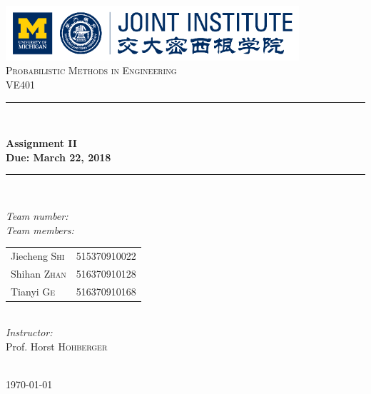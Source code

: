 \begin{titlepage}

\newcommand{\HRule}{\rule{\linewidth}{0.5mm}}

\center

\includegraphics[height=0.8in]{images/logo.png}\\[1cm]

\textsc{\Large Probabilistic Methods in Engineering}\\[0.4cm]
\textsc{\large VE401}\\[0.4cm]

\HRule \\[0.4cm]
{
    \bfseries
    {\huge Assignment II}\\[0.3cm]
    {\large Due: March 22, 2018}\\[0.2cm]
    \HRule \\[1.5cm]
}

\begin{minipage}{0.4\textwidth}

\large
\emph{Team number:} \quad{}\\

\emph{Team members:}\\

\begin{tabular}{ll}
    Jiecheng  \textsc{Shi} & 515370910022\\
    Shihan  \textsc{Zhan} & 516370910128\\
    Tianyi  \textsc{Ge} & 516370910168\\
\end{tabular}\\[1cm]


\emph{Instructor:}\\[0.1cm]
Prof. Horst \textsc{Hohberger}

\end{minipage}\\[2cm]

{\large \today}\\[2cm]

\vfill

\end{titlepage}

\clearpage